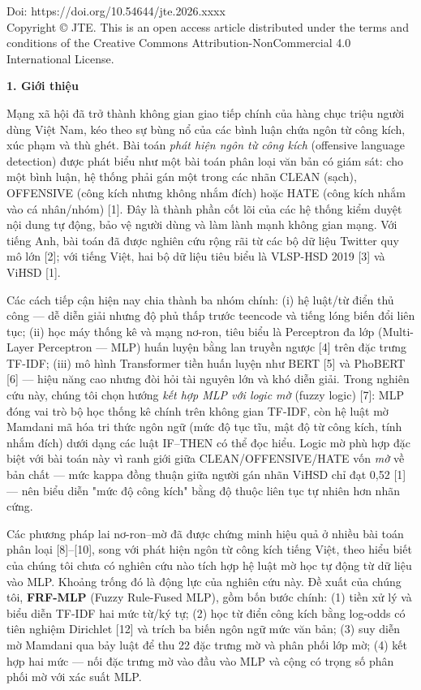 \documentclass[11pt,a4paper]{article}
\newcommand{\secvn}[1]{\vspace{6pt}\noindent\textbf{#1}\vspace{6pt}\par\nopagebreak}
\begin{document}
{\fontsize{9}{11}\selectfont\noindent Doi: https://doi.org/10.54644/jte.2026.xxxx\\
Copyright \copyright{} JTE. This is an open access article distributed under the terms and conditions of the Creative Commons Attribution-NonCommercial 4.0 International License.}

\secvn{1. Giới thiệu}

Mạng xã hội đã trở thành không gian giao tiếp chính của hàng chục triệu người dùng Việt Nam, kéo theo sự bùng nổ của các bình luận chứa ngôn từ công kích, xúc phạm và thù ghét. Bài toán \textit{phát hiện ngôn từ công kích} (offensive language detection) được phát biểu như một bài toán phân loại văn bản có giám sát: cho một bình luận, hệ thống phải gán một trong các nhãn CLEAN (sạch), OFFENSIVE (công kích nhưng không nhắm đích) hoặc HATE (công kích nhắm vào cá nhân/nhóm) [1]. Đây là thành phần cốt lõi của các hệ thống kiểm duyệt nội dung tự động, bảo vệ người dùng và làm lành mạnh không gian mạng. Với tiếng Anh, bài toán đã được nghiên cứu rộng rãi từ các bộ dữ liệu Twitter quy mô lớn [2]; với tiếng Việt, hai bộ dữ liệu tiêu biểu là VLSP-HSD 2019 [3] và ViHSD [1].

Các cách tiếp cận hiện nay chia thành ba nhóm chính: (i) hệ luật/từ điển thủ công — dễ diễn giải nhưng độ phủ thấp trước teencode và tiếng lóng biến đổi liên tục; (ii) học máy thống kê và mạng nơ-ron, tiêu biểu là Perceptron đa lớp (Multi-Layer Perceptron — MLP) huấn luyện bằng lan truyền ngược [4] trên đặc trưng TF-IDF; (iii) mô hình Transformer tiền huấn luyện như BERT [5] và PhoBERT [6] — hiệu năng cao nhưng đòi hỏi tài nguyên lớn và khó diễn giải. Trong nghiên cứu này, chúng tôi chọn hướng \textit{kết hợp MLP với logic mờ} (fuzzy logic) [7]: MLP đóng vai trò bộ học thống kê chính trên không gian TF-IDF, còn hệ luật mờ Mamdani mã hóa tri thức ngôn ngữ (mức độ tục tĩu, mật độ từ công kích, tính nhắm đích) dưới dạng các luật IF--THEN có thể đọc hiểu. Logic mờ phù hợp đặc biệt với bài toán này vì ranh giới giữa CLEAN/OFFENSIVE/HATE vốn \textit{mờ} về bản chất — mức kappa đồng thuận giữa người gán nhãn ViHSD chỉ đạt 0,52 [1] — nên biểu diễn "mức độ công kích" bằng độ thuộc liên tục tự nhiên hơn nhãn cứng.

Các phương pháp lai nơ-ron--mờ đã được chứng minh hiệu quả ở nhiều bài toán phân loại [8]--[10], song với phát hiện ngôn từ công kích tiếng Việt, theo hiểu biết của chúng tôi chưa có nghiên cứu nào tích hợp hệ luật mờ học tự động từ dữ liệu vào MLP. Khoảng trống đó là động lực của nghiên cứu này. Đề xuất của chúng tôi, \textbf{FRF-MLP} (Fuzzy Rule-Fused MLP), gồm bốn bước chính: (1) tiền xử lý và biểu diễn TF-IDF hai mức từ/ký tự; (2) học từ điển công kích bằng log-odds có tiên nghiệm Dirichlet [12] và trích ba biến ngôn ngữ mức văn bản; (3) suy diễn mờ Mamdani qua bảy luật để thu 22 đặc trưng mờ và phân phối lớp mờ; (4) kết hợp hai mức — nối đặc trưng mờ vào đầu vào MLP và cộng có trọng số phân phối mờ với xác suất MLP.
\end{document}

